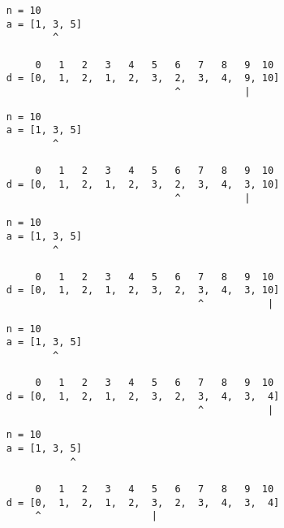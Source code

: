 \begin{frame}[fragile]
\begin{verbatim}
     n = 10
     a = [1, 3, 5]
             ^

          0   1   2   3   4   5   6   7   8   9  10
     d = [0,  1,  2,  1,  2,  3,  2,  3,  4,  9, 10]
                                  ^           |
\end{verbatim}
\end{frame}
\addtocounter{framenumber}{-1}

\begin{frame}[fragile]
\begin{verbatim}
     n = 10
     a = [1, 3, 5]
             ^

          0   1   2   3   4   5   6   7   8   9  10
     d = [0,  1,  2,  1,  2,  3,  2,  3,  4,  3, 10]
                                  ^           |
\end{verbatim}
\end{frame}
\addtocounter{framenumber}{-1}

\begin{frame}[fragile]
\begin{verbatim}
     n = 10
     a = [1, 3, 5]
             ^

          0   1   2   3   4   5   6   7   8   9  10
     d = [0,  1,  2,  1,  2,  3,  2,  3,  4,  3, 10]
                                      ^           |
\end{verbatim}
\end{frame}
\addtocounter{framenumber}{-1}

\begin{frame}[fragile]
\begin{verbatim}
     n = 10
     a = [1, 3, 5]
             ^

          0   1   2   3   4   5   6   7   8   9  10
     d = [0,  1,  2,  1,  2,  3,  2,  3,  4,  3,  4]
                                      ^           |
\end{verbatim}
\end{frame}
\addtocounter{framenumber}{-1}

\begin{frame}[fragile]
\begin{verbatim}
     n = 10
     a = [1, 3, 5]
                ^

          0   1   2   3   4   5   6   7   8   9  10
     d = [0,  1,  2,  1,  2,  3,  2,  3,  4,  3,  4]
          ^                   |
\end{verbatim}
\end{frame}
\addtocounter{framenumber}{-1}

